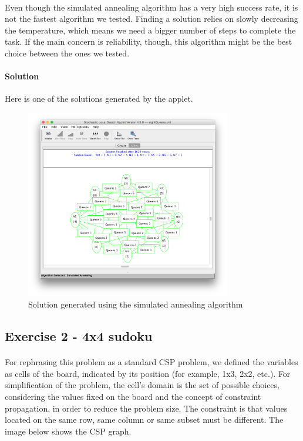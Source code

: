 \documentclass{article}
\begin{document}
\paragraph{} Even though the simulated annealing algorithm has a very high success rate, it is not the fastest algorithm we tested. Finding a solution relies on slowly decreasing the temperature, which means we need a bigger number of steps to complete the task. If the main concern is reliability, though, this algorithm might be the best choice between the ones we tested.

\pagebreak

\paragraph{Solution} Here is one of the solutions generated by the applet.

\begin{figure}[!ht]
\centering
\includegraphics[width=0.8\textwidth]{SA-solution}
\caption{Solution generated using the simulated annealing algorithm}
\label{SA - solution}
\end{figure}


\subsection*{Exercise 2 - 4x4 sudoku}
\paragraph{} For rephrasing this problem as a standard CSP problem, we defined the variables as cells of the board, indicated by its position (for example, 1x3, 2x2, etc.). For simplification of the problem, the cell's domain is the set of possible choices, considering the values fixed on the board and the concept of constraint propagation, in order to reduce the problem size. The constraint is that values located on the same row, same column or same subset must be different. The image below shows the CSP graph.
\end{document}
